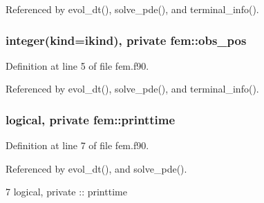 Referenced by evol\+\_\+dt(), solve\+\_\+pde(), and terminal\+\_\+info().

\subsubsection[{obs\+\_\+pos}]{\setlength{\rightskip}{0pt plus 5cm}integer(kind=ikind), private fem\+::obs\+\_\+pos\hspace{0.3cm}{\ttfamily [private]}}\label{namespacefem_af40fab50b476783ac7bda3c73f56ad19}


Definition at line 5 of file fem.\+f90.



Referenced by evol\+\_\+dt(), solve\+\_\+pde(), and terminal\+\_\+info().

\subsubsection[{printtime}]{\setlength{\rightskip}{0pt plus 5cm}logical, private fem\+::printtime\hspace{0.3cm}{\ttfamily [private]}}\label{namespacefem_aabdb7c5964d7949329ceab976150a6cc}


Definition at line 7 of file fem.\+f90.



Referenced by evol\+\_\+dt(), and solve\+\_\+pde().


\begin{DoxyCode}
7   \textcolor{keywordtype}{logical}, \textcolor{keywordtype}{private} :: printtime
\end{DoxyCode}
